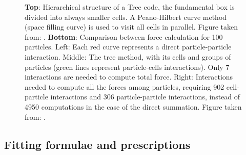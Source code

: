 \begin{figure}[h]
%
%
\caption[\textbf{Top}: Hierarchical structure of a Tree code, the fundamental
box is divided into always smaller cells. Figure taken from: \citet{springel_cosmological_2005}.
\textbf{Bottom}:Comparison between force calculation for 100 particles.
Figure taken from: \citet{dehnen_n-body_2011}.]{\label{fig:5.1}\textbf{Top}: Hierarchical structure of a Tree code,
the fundamental box is divided into always smaller cells. A Peano-Hilbert
curve method (space filling curve) is used to visit all cells in parallel.
Figure taken from: \citet{springel_cosmological_2005}. \textbf{Bottom}:
Comparison between force calculation for 100 particles. Left: Each
red curve represents a direct particle-particle interaction. Middle:
The tree method, with its cells and groups of particles (green lines
represent particle-cells interactions). Only 7 interactions are needed
to compute total force. Right: Interactions needed to compute all
the forces among particles, requiring 902 cell-particle interactions
and 306 particle-particle interactions, instead of 4950 computations
in the case of the direct summation. Figure taken from: \citet{dehnen_n-body_2011}.}
\end{figure}


\subsection{Fitting formulae and prescriptions}
